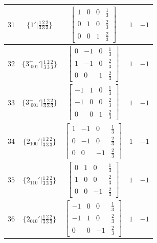 \documentclass[fleqn,8pt]{jsarticle}
\begin{document}
\begin{longtable}{ccccc}
$ 31 $ & $ \{1{}'|\frac{1}{3} \frac{2}{3} \frac{2}{3}\} $ & $ \begin{bmatrix} 1 & 0 & 0 & \frac{1}{3} \\ 0 & 1 & 0 & \frac{2}{3} \\ 0 & 0 & 1 & \frac{2}{3} \end{bmatrix} $ & $ 1 $ & $ -1 $ \\ \hline
$ 32 $ & $ \{3^{+}_{\,\,001}{}'|\frac{1}{3} \frac{2}{3} \frac{2}{3}\} $ & $ \begin{bmatrix} 0 & -1 & 0 & \frac{1}{3} \\ 1 & -1 & 0 & \frac{2}{3} \\ 0 & 0 & 1 & \frac{2}{3} \end{bmatrix} $ & $ 1 $ & $ -1 $ \\ \hline
$ 33 $ & $ \{3^{-}_{\,\,001}{}'|\frac{1}{3} \frac{2}{3} \frac{2}{3}\} $ & $ \begin{bmatrix} -1 & 1 & 0 & \frac{1}{3} \\ -1 & 0 & 0 & \frac{2}{3} \\ 0 & 0 & 1 & \frac{2}{3} \end{bmatrix} $ & $ 1 $ & $ -1 $ \\ \hline
$ 34 $ & $ \{2{}_{100}{}'|\frac{1}{3} \frac{2}{3} \frac{2}{3}\} $ & $ \begin{bmatrix} 1 & -1 & 0 & \frac{1}{3} \\ 0 & -1 & 0 & \frac{2}{3} \\ 0 & 0 & -1 & \frac{2}{3} \end{bmatrix} $ & $ 1 $ & $ -1 $ \\ \hline
$ 35 $ & $ \{2{}_{110}{}'|\frac{1}{3} \frac{2}{3} \frac{2}{3}\} $ & $ \begin{bmatrix} 0 & 1 & 0 & \frac{1}{3} \\ 1 & 0 & 0 & \frac{2}{3} \\ 0 & 0 & -1 & \frac{2}{3} \end{bmatrix} $ & $ 1 $ & $ -1 $ \\ \hline
$ 36 $ & $ \{2{}_{010}{}'|\frac{1}{3} \frac{2}{3} \frac{2}{3}\} $ & $ \begin{bmatrix} -1 & 0 & 0 & \frac{1}{3} \\ -1 & 1 & 0 & \frac{2}{3} \\ 0 & 0 & -1 & \frac{2}{3} \end{bmatrix} $ & $ 1 $ & $ -1 $ \\
\end{longtable}
\end{document}

